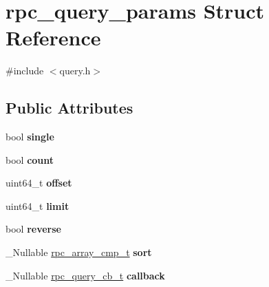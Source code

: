 \hypertarget{structrpc__query__params}{}\section{rpc\+\_\+query\+\_\+params Struct Reference}
\label{structrpc__query__params}


{\ttfamily \#include $<$query.\+h$>$}

\subsection*{Public Attributes}
\begin{DoxyCompactItemize}
\item 
bool {\bfseries single}\hypertarget{structrpc__query__params_a6e4eafac062b7f7490a4983d56296385}{}\label{structrpc__query__params_a6e4eafac062b7f7490a4983d56296385}

\item 
bool {\bfseries count}\hypertarget{structrpc__query__params_a7b488114aeb262c508dd28acc1a7fc95}{}\label{structrpc__query__params_a7b488114aeb262c508dd28acc1a7fc95}

\item 
uint64\+\_\+t {\bfseries offset}\hypertarget{structrpc__query__params_a4e33edf4295472adcc84d6d1ccee2ddd}{}\label{structrpc__query__params_a4e33edf4295472adcc84d6d1ccee2ddd}

\item 
uint64\+\_\+t {\bfseries limit}\hypertarget{structrpc__query__params_a89ee7bc896675c8c2ef148436430ba0a}{}\label{structrpc__query__params_a89ee7bc896675c8c2ef148436430ba0a}

\item 
bool {\bfseries reverse}\hypertarget{structrpc__query__params_ad50d1e6e25322f5562ec1793647c1618}{}\label{structrpc__query__params_ad50d1e6e25322f5562ec1793647c1618}

\item 
\+\_\+\+Nullable \hyperlink{object_8h_a29f4de14614637dc5848764170dcd186}{rpc\+\_\+array\+\_\+cmp\+\_\+t} {\bfseries sort}\hypertarget{structrpc__query__params_a39c5b870500ba92953fa1794510223e8}{}\label{structrpc__query__params_a39c5b870500ba92953fa1794510223e8}

\item 
\+\_\+\+Nullable \hyperlink{query_8h_a2e4187b74c3bd970f9e41bb2d02d09a0}{rpc\+\_\+query\+\_\+cb\+\_\+t} {\bfseries callback}\hypertarget{structrpc__query__params_ad0cf32046078f82f707dc9d656bcfe01}{}\label{structrpc__query__params_ad0cf32046078f82f707dc9d656bcfe01}

\end{DoxyCompactItemize}


